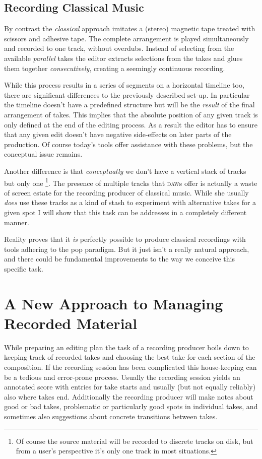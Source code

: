 \documentclass[11pt,a4paper]{article}
\begin{document}
\subsection{Recording Classical Music}
 
By contrast the \emph{classical} approach imitates a (stereo) magnetic tape treated with scissors and adhesive tape.
The complete arrangement is played simultaneously and recorded to one track, without overdubs.
Instead of selecting from the available \emph{parallel} takes the editor extracts selections from the takes and glues them together \emph{consecutively}, creating a seemingly continuous recording.

While this process results in a series of segments on a horizontal timeline too, there are significant differences to the previously described set-up.
In particular the timeline doesn't have a predefined structure but will be the \emph{result} of the final arrangement of takes.
This implies that the absolute position of any given track is only defined at the end of the editing process.
As a result the editor has to ensure that any given edit doesn't have negative side-effects on later parts of the production.
Of course today's tools offer assistance with these problems, but the conceptual issue remains.

Another difference is that \emph{conceptually} we don't have a vertical stack of tracks but only one%
\footnote{Of course the source material will be recorded to discrete tracks on disk, but from a user's perspective it's only one track in most situations.}.
The presence of multiple tracks that \textsc{daw}s offer is actually a waste of screen estate for the recording producer of classical music.
While she usually \emph{does} use these tracks as a kind of stash to experiment with alternative takes for a given spot I will show that this task can be addresses in a completely different manner.

Reality proves that it \emph{is} perfectly possible to produce classical recordings with tools adhering to the pop paradigm.
But it just isn't a really natural approach, and there could be fundamental improvements to the way we conceive this specific task. 

\section{A New Approach to Managing Recorded Material}

While preparing an editing plan the task of a recording producer boils down to keeping track of recorded takes and choosing the best take for each section of the composition.
If the recording session has been complicated this house-keeping can be a tedious and error-prone process.
Usually the recording session yields an annotated score with entries for take starts and usually (but not equally reliably) also where takes end.
Additionally the recording producer will make notes about good or bad takes, problematic or particularly good spots in individual takes, and sometimes also suggestions about concrete transitions between takes.
\end{document}

